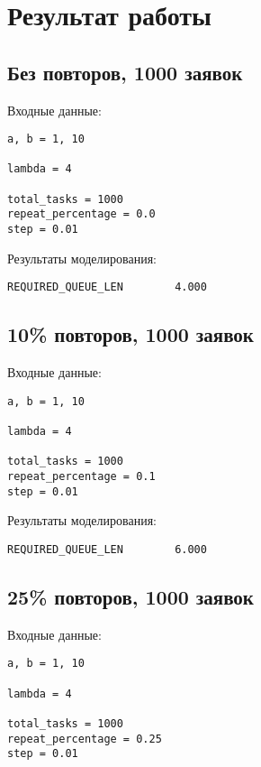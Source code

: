 \chapter{Результат работы}

\section{Без повторов, 1000 заявок}

Входные данные:

\begin{verbatim}
a, b = 1, 10

lambda = 4

total_tasks = 1000
repeat_percentage = 0.0
step = 0.01
\end{verbatim}

Результаты моделирования:

\begin{verbatim}
REQUIRED_QUEUE_LEN        4.000                            
\end{verbatim}

\section{10\% повторов, 1000 заявок}

Входные данные:

\begin{verbatim}
a, b = 1, 10

lambda = 4

total_tasks = 1000
repeat_percentage = 0.1
step = 0.01
\end{verbatim}

Результаты моделирования:

\begin{verbatim}
REQUIRED_QUEUE_LEN        6.000                            
\end{verbatim}

\section{25\% повторов, 1000 заявок}

Входные данные:

\begin{verbatim}
a, b = 1, 10

lambda = 4

total_tasks = 1000
repeat_percentage = 0.25
step = 0.01
\end{verbatim}


